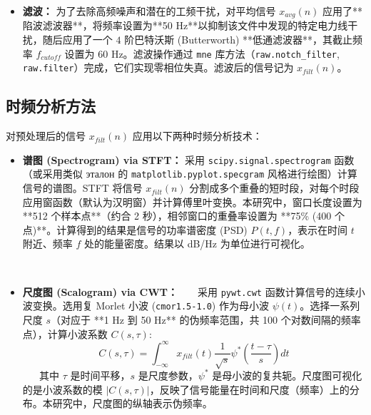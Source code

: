 \documentclass{article}
\begin{document}
\begin{paracol}{2}
\begin{itemize}
\item \textbf{滤波：} 为了去除高频噪声和潜在的工频干扰，对平均信号 $x_{avg}(n)$ 应用了**陷波滤波器**，将频率设置为**50 Hz**以抑制该文件中发现的特定电力线干扰，随后应用了一个 $4$ 阶巴特沃斯 (Butterworth) **低通滤波器**，其截止频率 $f_{cutoff}$ 设置为 60 Hz。滤波操作通过 \texttt{mne} 库方法（\texttt{raw.notch_filter}, \texttt{raw.filter}）完成，它们实现零相位失真。滤波后的信号记为 $x_{filt}(n)$。%
\end{itemize}

\subsection{时频分析方法} %

对预处理后的信号 $x_{filt}(n)$ 应用以下两种时频分析技术：

\begin{itemize}
 \item \textbf{谱图 (Spectrogram) via STFT：}
采用 \texttt{scipy.signal.spectrogram} 函数（或采用类似 эталон 的 \texttt{matplotlib.pyplot.specgram} 风格进行绘图）计算信号的谱图。STFT 将信号 $x_{filt}(n)$ 分割成多个重叠的短时段，对每个时段应用窗函数（默认为汉明窗）并计算傅里叶变换。本研究中，窗口长度设置为 **512 个样本点**（约合 2 秒），相邻窗口的重叠率设置为 **75\% (400 个点)**。计算得到的结果是信号的功率谱密度 (PSD) $P(t, f)$，表示在时间 $t$ 附近、频率 $f$ 处的能量密度。结果以 dB/Hz 为单位进行可视化。 %

    \item \textbf{尺度图 (Scalogram) via CWT：}
    采用 \texttt{pywt.cwt} 函数计算信号的连续小波变换。选用复 Morlet 小波 (\texttt{cmor1.5-1.0}) 作为母小波 $\psi(t)$。选择一系列尺度 $s$（对应于 **1 Hz 到 50 Hz** 的伪频率范围，共 100 个对数间隔的频率点），计算小波系数 $C(s, \tau)$:
    \[ C(s, \tau) = \int_{-\infty}^{\infty} x_{filt}(t) \frac{1}{\sqrt{s}} \psi^*\left(\frac{t-\tau}{s}\right) dt \]
    其中 $\tau$ 是时间平移，$s$ 是尺度参数，$\psi^*$ 是母小波的复共轭。尺度图可视化的是小波系数的模 $|C(s, \tau)|$，反映了信号能量在时间和尺度（频率）上的分布。本研究中，尺度图的纵轴表示伪频率。 %
\end{itemize}
\switchcolumn* %


\end{paracol}
\end{document}
